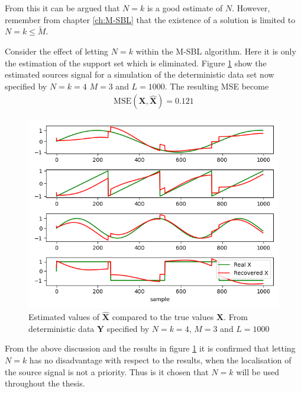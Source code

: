 From this it can be argued that $N = k$ is a good estimate of $N$. 
However, remember from chapter \ref{ch:M-SBL} that the existence of a solution is limited to $N=k \leq \widetilde{M}$.

Consider the effect of letting $N = k$ within the M-SBL algorithm. 
Here it is only the estimation of the support set which is eliminated. 
Figure \ref{fig:M-SBL_simple3} show the estimated sources signal for a simulation of the deterministic data set now specified by $N=k=4$ $M = 3$ and $L=1000$. The resulting MSE become
\begin{align*}
\text{MSE}(\mathbf{X}, \hat{\mathbf{X}}) = 0.121
\end{align*}

\begin{figure}[H]
\centering
\includegraphics[scale=0.5]{figures/ch_6/M-SBL_simple3.png}
\caption{Estimated values of $\hat{\textbf{X}}$ compared to the true 				values $\textbf{X}$. From deterministic data $\textbf{Y}$ specified by $N=k=4$, $M = 3$ and $L=1000$ }
\label{fig:M-SBL_simple3}
\end{figure}

From the above discussion and the results in figure \ref{fig:M-SBL_simple3} it is confirmed that letting $N=k$ has no disadvantage with respect to the results, when the localisation of the source signal is not a priority. Thus is it chosen that $N=k$ will be used throughout the thesis. 

